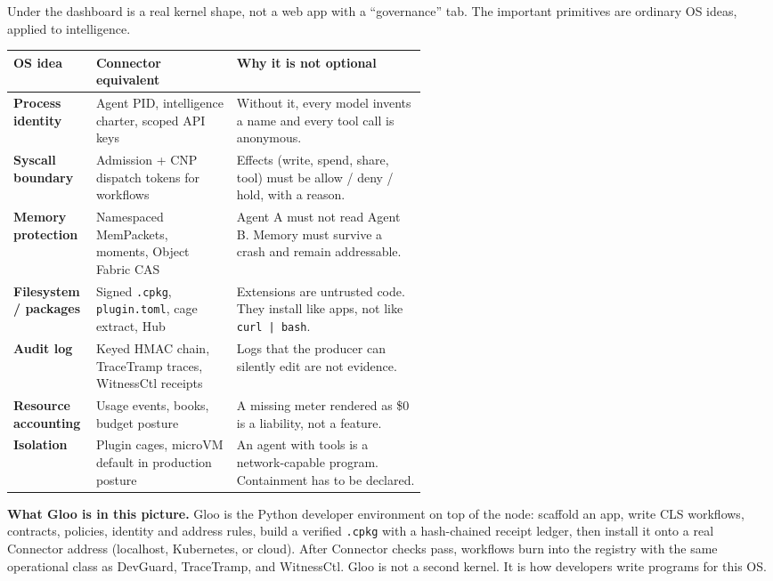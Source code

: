 \documentclass[10pt]{article}
\begin{document}
Under the dashboard is a real kernel shape, not a web app with a ``governance'' tab. The important primitives are ordinary OS ideas, applied to intelligence.

\renewcommand{\arraystretch}{1.14}
{\small
\begin{tabularx}{\linewidth}{@{}>{\bfseries\arraybackslash}p{0.20\linewidth} p{0.34\linewidth} X@{}}
\toprule
OS idea & Connector equivalent & Why it is not optional \\
\midrule
Process identity & Agent PID, intelligence charter, scoped API keys & Without it, every model invents a name and every tool call is anonymous. \\
Syscall boundary & Admission + CNP dispatch tokens for workflows & Effects (write, spend, share, tool) must be allow / deny / hold, with a reason. \\
Memory protection & Namespaced MemPackets, moments, Object Fabric CAS & Agent A must not read Agent B. Memory must survive a crash and remain addressable. \\
Filesystem / packages & Signed \texttt{.cpkg}, \texttt{plugin.toml}, cage extract, Hub & Extensions are untrusted code. They install like apps, not like \texttt{curl | bash}. \\
Audit log & Keyed HMAC chain, TraceTramp traces, WitnessCtl receipts & Logs that the producer can silently edit are not evidence. \\
Resource accounting & Usage events, books, budget posture & A missing meter rendered as \$0 is a liability, not a feature. \\
Isolation & Plugin cages, microVM default in production posture & An agent with tools is a network-capable program. Containment has to be declared. \\
\bottomrule
\end{tabularx}}

\vspace{0.28em}
\noindent\colorbox{boxfill}{\parbox{\dimexpr\linewidth-2\fboxsep\relax}{%
\textbf{What Gloo is in this picture.} Gloo is the Python developer environment on top of the node: scaffold an app, write CLS workflows, contracts, policies, identity and address rules, build a verified \texttt{.cpkg} with a hash-chained receipt ledger, then install it onto a real Connector address (localhost, Kubernetes, or cloud). After Connector checks pass, workflows burn into the registry with the same operational class as DevGuard, TraceTramp, and WitnessCtl. Gloo is not a second kernel. It is how developers write programs for this OS.}}
\end{document}

